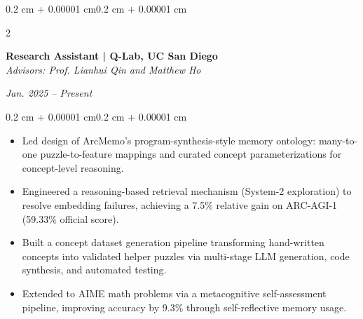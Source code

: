 \documentclass[10pt, letterpaper]{article}
\newenvironment{highlights}{
    \begin{itemize}[
        topsep=0.10 cm,
        parsep=0.10 cm,
        partopsep=0pt,
        itemsep=0pt,
        leftmargin=0.4 cm + 10pt
    ]
}{\end{itemize}}
\newenvironment{onecolentry}{
    \begin{adjustwidth}{0.2 cm + 0.00001 cm}{0.2 cm + 0.00001 cm}
}{\end{adjustwidth}}
\newenvironment{twocolentry}[2][]{
    \onecolentry
    \def\secondColumn{#2}
    \setcolumnwidth{\fill, 4.5 cm}
    \begin{paracol}{2}
}{
    \switchcolumn \raggedleft \secondColumn
    \end{paracol}
    \endonecolentry
}
\begin{document}
    \begin{twocolentry}{\textit{Jan. 2025 -- Present}}
        \textbf{Research Assistant | Q-Lab, UC San Diego}\\
        \textit{Advisors: Prof. Lianhui Qin and Matthew Ho}
    \end{twocolentry}
    \vspace{0.10 cm}
    \begin{onecolentry}
        \begin{highlights}
            \item Led design of ArcMemo's program-synthesis-style memory ontology: many-to-one puzzle-to-feature mappings and curated concept parameterizations for concept-level reasoning.
            \item Engineered a reasoning-based retrieval mechanism (System-2 exploration) to resolve embedding failures, achieving a 7.5\% relative gain on ARC-AGI-1 (59.33\% official score).
            \item Built a concept dataset generation pipeline transforming hand-written concepts into validated helper puzzles via multi-stage LLM generation, code synthesis, and automated testing.
            \item Extended to AIME math problems via a metacognitive self-assessment pipeline, improving accuracy by 9.3\% through self-reflective memory usage.
        \end{highlights}
    \end{onecolentry}
    \vspace{0.20 cm}
\end{document}
